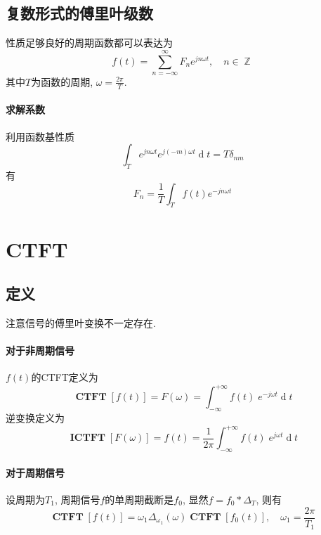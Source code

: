 \documentclass{ctexart}
\DeclareMathOperator{\CTFT}{\mathbf{CTFT}}
\DeclareMathOperator{\ICTFT}{\mathbf{ICTFT}}
\DeclareMathOperator{\ud}{\mathrm{d}}
\DeclareMathOperator{\Zset}{\mathbb{Z}}
\begin{document}
\subsection{复数形式的傅里叶级数}
    性质足够良好的周期函数都可以表达为\[
        f(t) = \sum_{n = -\infty}^{\infty} F_n e^{j n \omega t},\quad n \in \Zset
    \]其中$T$为函数的周期, $\omega = \frac{2\pi}{T}$.
\paragraph{求解系数}
    利用函数基性质 \[
        \int_T e^{j n \omega t} e^{j (-m) \omega t} \ud t = T \delta_{nm}\]
    有\[
        F_n = \frac{1}{T} \int_T f(t) e^{-j n \omega t}\]

\section{CTFT}
\subsection{定义}
注意信号的傅里叶变换不一定存在.
\paragraph{对于非周期信号} $f(t)$的CTFT定义为 \[
    \CTFT[f(t)] = F(\omega) = \int_{-\infty}^{+\infty} f(t)\; e^{-j \omega t} \ud t \]
    逆变换定义为 \[
    \ICTFT[F(\omega)] = f(t) = \frac{1}{2\pi} \int_{-\infty}^{+\infty} f(t)\; e^{j \omega t} \ud t \]

\paragraph{对于周期信号}
    设周期为$T_1$, 周期信号$f$的单周期截断是$f_0$, 显然$f = f_0 * \Delta_T$,
    则有 \[
        \CTFT[ f(t) ] = \omega_1 \Delta_{\omega_1}(\omega) \CTFT[ f_0(t) ] ,\quad \omega_1 = \frac{2\pi}{T_1}  \]
\end{document}
